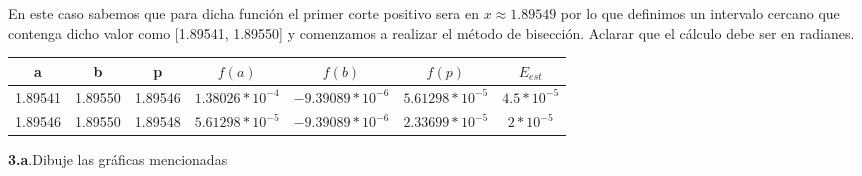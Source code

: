 \documentclass[12pt]{article}
\begin{document}
En este caso sabemos que para dicha función el primer corte positivo sera en $x \approx 1.89549$ por lo que definimos un intervalo cercano que contenga dicho valor como [1.89541, 1.89550]
y comenzamos a realizar el método de bisección. Aclarar que el cálculo debe ser en radianes.
\begin{center}
    \begin{tabular}{|c|c|c|c|c|c|c|}
        \hline
        a & b&p&$f(a)$&$f(b)$&$f(p)$&$E_{est}$\\
        \hline
        1.89541    & 1.89550 &  1.89546     & $1.38026*10^{-4}$& $-9.39089*10^{-6}$& $5.61298*10^{-5}$  & $4.5*10^{-5}$\\
        1.89546    & 1.89550 &  1.89548     & $5.61298*10^{-5}$& $-9.39089*10^{-6}$& $2.33699*10^{-5}$  & $2*10^{-5}$\\
        \hline
      \end{tabular} 
\end{center}

\textbf{3.a}.Dibuje las gráficas mencionadas 
\end{document}
